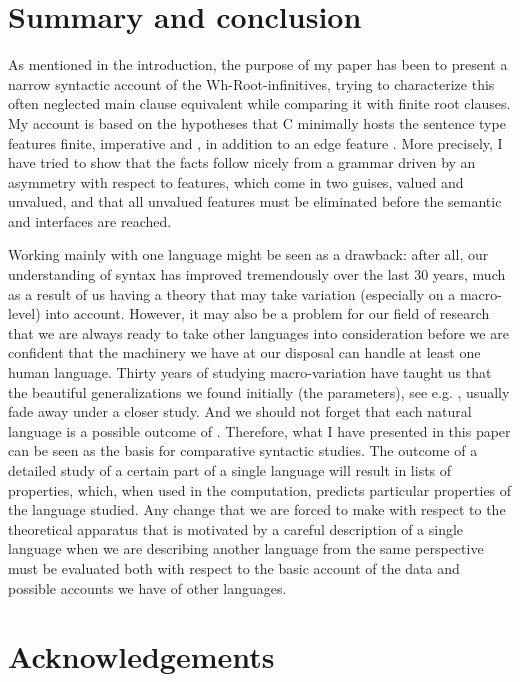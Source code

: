 \documentclass[output=paper]{LSP/langsci}
\begin{document}
\section{Summary and conclusion}\label{sec:platzack:5}

As mentioned in the introduction, the purpose of my paper has been to present a narrow syntactic account of the  Wh-Root-infinitives, trying to characterize this often neglected main clause equivalent while comparing it with finite root clauses. My account is based on the hypotheses that C minimally hosts the sentence type features finite, imperative and , in addition to an edge feature \citep[11 f]{Chomsky2007}. More precisely, I have tried to show that the  facts follow nicely from a grammar driven by an asymmetry with respect to features, which come in two guises, valued and unvalued, and that all unvalued features must be eliminated before the semantic and  interfaces are reached.

Working mainly with one language might be seen as a drawback: after all, our understanding of syntax has improved tremendously over the last 30 years, much as a result of us having a theory that may take variation (especially on a macro-level) into account. However, it may also be a problem for our field of research that we are always ready to take other languages into consideration before we are confident that the machinery we have at our disposal can handle at least one human language. Thirty years of studying macro-variation have taught us that the beautiful generalizations we found initially (the parameters), see e.g. \citet{HolmbergPlatzack1995}, usually fade away under a closer study. And we should not forget that each natural language is a possible outcome of . Therefore, what I have presented in this paper can be seen as the basis for comparative syntactic studies. The outcome of a detailed study of a certain part of a single language will result in lists of properties, which, when used in the computation, predicts particular properties of the language studied. Any change that we are forced to make with respect to the theoretical apparatus that is motivated by a careful description of a single language when we are describing another language from the same perspective must be evaluated both with respect to the basic account of the data and possible accounts we have of other languages. 

\section*{Acknowledgements}
\end{document}
